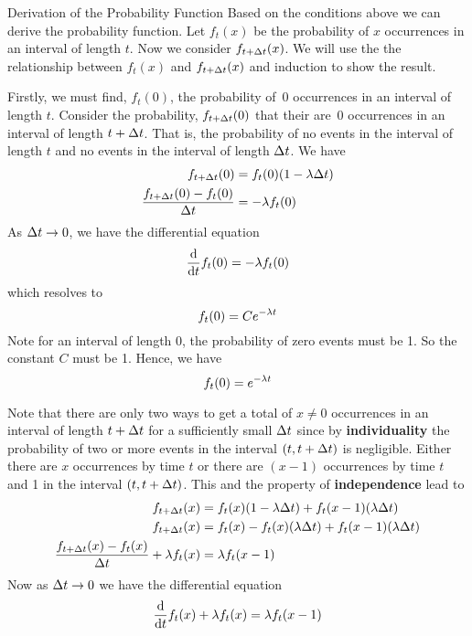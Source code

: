 \begin{theory}{Derivation of the Probability Function}
Based on the conditions above we can derive the probability function. Let $f_t(x)$ be the probability of $x$ occurrences in an interval of length $t$. Now we consider $f_{t + \Delta t}(x)$. We will use the the relationship between $f_t(x)$ and $f_{t + \Delta t}(x)$ and induction to show the result.
\par\smallskip
Firstly, we must find, $f_t(0)$, the probability of~0 occurrences in an interval of length $t$. Consider the probability, $f_{t + \Delta t}(0)$ that their are~0 occurrences in an interval of length $t + \Delta t$. That is, the probability of no events in the interval of length $t$ and no events in the interval of length $\Delta t$. We have
\begin{align*}
    f_{t+\Delta t}(0) &= f_t(0)(1 - \lambda \Delta t) \\
    \frac{f_{t+\Delta t}(0) - f_t(0)}{\Delta t} &= -\lambda f_t(0) \\
\end{align*}
As $\Delta t \rightarrow 0$, we have the differential equation
\[
    \frac{\operatorname{d}\!{}}{\operatorname{d}\!{t}} f_t(0) = -\lambda f_t(0)
\]
which resolves to
\[
    f_t(0) = Ce^{-\lambda t}
\]
Note for an interval of length 0, the probability of zero events must be 1. So the constant $C$ must be 1. Hence, we have
\[
    f_t(0) = e^{-\lambda t}
\]
\par\smallskip
Note that there are only two ways to get a total of $x \neq 0$ occurrences in an interval of length $t + \Delta t$ for a sufficiently small $\Delta t$ since by \textbf{individuality} the probability of two or more events in the interval $(t, t + \Delta t)$ is negligible. Either there are $x$ occurrences by time $t$ or there are $(x-1)$ occurrences by time $t$ and 1 in the interval $(t, t + \Delta t)$. This and the property of \textbf{independence} lead to
\begin{align*}
    f_{t + \Delta t}(x) &= f_t(x)(1 - \lambda \Delta t) + f_t(x - 1)(\lambda \Delta t) \\
    f_{t + \Delta t}(x) &= f_t(x) - f_t(x)(\lambda \Delta t) + f_t(x - 1)(\lambda \Delta t) \\
    \frac{f_{t + \Delta t}(x) - f_t(x)}{\Delta t} + \lambda f_t(x) &= \lambda f_t(x-1)
\end{align*}
Now as $\Delta t \rightarrow 0$ we have the differential equation
\begin{align}
    \deriv{t} f_t(x) + \rate f_t(x) &= \rate f_t(x-1) \nonumber \\

\end{align}
\end{theory}
